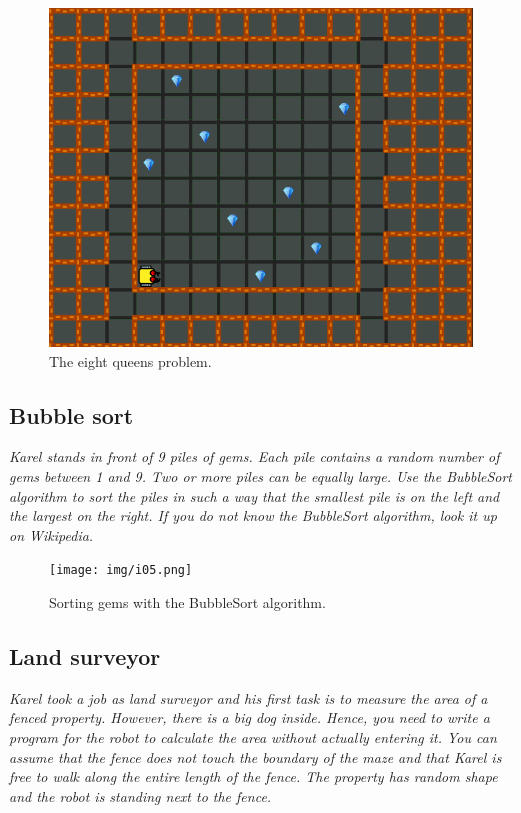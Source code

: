 \begin{figure}[!ht]
\begin{center}
\includegraphics[height=0.4\textwidth]{img/i04.png}
\end{center}
\vspace{-4mm}
\caption{The eight queens problem.}
\label{fig:g14}
\end{figure}

\newpage

\subsection{Bubble sort}

\noindent
{\em Karel stands in front of 9 piles of gems. Each pile contains a random number of gems between 1 and 9. Two or more piles can be equally large. Use the BubbleSort algorithm to sort the piles in such a way that the smallest pile is on the left and the largest on the right. If you do not know the BubbleSort algorithm, look it up on Wikipedia.}

\begin{figure}[!ht]
\begin{center}
\texttt{[image: img/i05.png]}
\end{center}
\vspace{-4mm}
\caption{Sorting gems with the BubbleSort algorithm.}
\label{fig:g13}
\end{figure}

\newpage
\subsection{Land surveyor}

\noindent
{\em Karel took a job as land surveyor and his first task is to measure the area of a fenced property. However, there is a big dog inside. Hence, you need to write a program for the robot to calculate the area without actually entering it. You can assume that the fence does not touch the boundary of the maze and that Karel is free to walk along the entire length of the fence. The property has random shape and the robot is standing next to the fence.}

